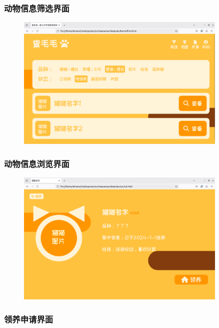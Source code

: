 \documentclass[12pt,a4paper,UTF8]{article}
\begin{document}
\subsubsection{动物信息筛选界面}

\begin{figure}[H]
  \centering
  \includegraphics[width=0.9\textwidth]{figures/AnimalInfo1.png}
\end{figure}

\subsubsection{动物信息浏览界面}

\begin{figure}[H]
  \centering
  \includegraphics[width=0.9\textwidth]{figures/AnimalInfo2.png}
\end{figure}

\subsubsection{领养申请界面}
\end{document}
